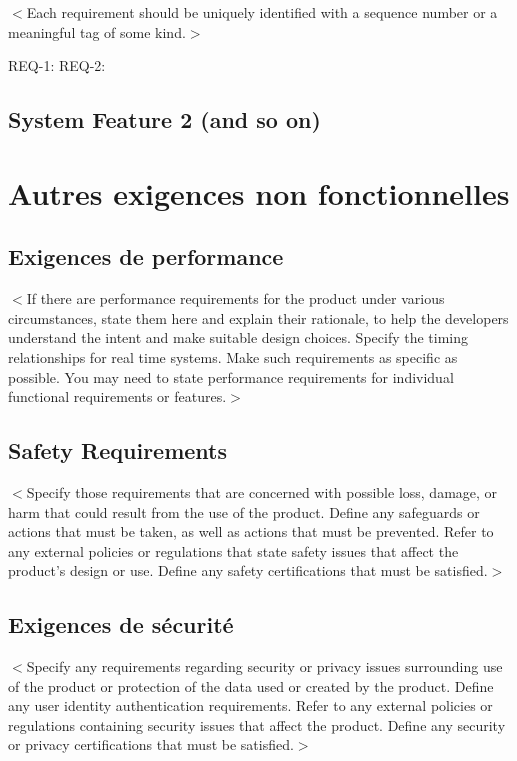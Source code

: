 \documentclass[titlepage, 12pt]{report}
\begin{document}
$<$Each requirement should be uniquely identified with a sequence number or a 
meaningful tag of some kind.$>$

REQ-1:	REQ-2:

\section{System Feature 2 (and so on)}


\chapter{Autres exigences non fonctionnelles}

\section{Exigences de performance}
$<$If there are performance requirements for the product under various 
circumstances, state them here and explain their rationale, to help the 
developers understand the intent and make suitable design choices. Specify the 
timing relationships for real time systems. Make such requirements as specific 
as possible. You may need to state performance requirements for individual 
functional requirements or features.$>$

\section{Safety Requirements}
$<$Specify those requirements that are concerned with possible loss, damage, or 
harm that could result from the use of the product. Define any safeguards or 
actions that must be taken, as well as actions that must be prevented. Refer to 
any external policies or regulations that state safety issues that affect the 
product’s design or use. Define any safety certifications that must be 
satisfied.$>$

\section{Exigences de sécurité}
$<$Specify any requirements regarding security or privacy issues surrounding use 
of the product or protection of the data used or created by the product. Define 
any user identity authentication requirements. Refer to any external policies or 
regulations containing security issues that affect the product. Define any 
security or privacy certifications that must be satisfied.$>$
\end{document}
